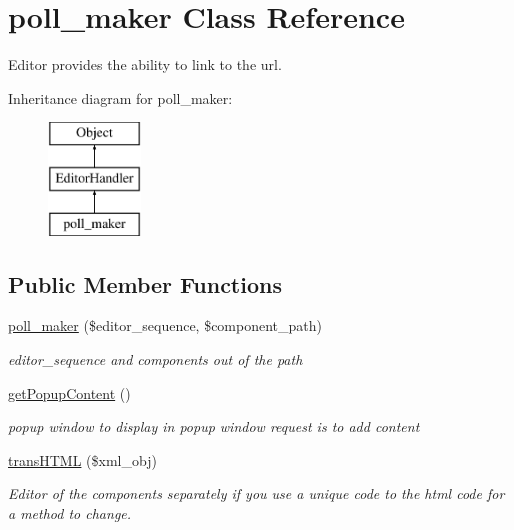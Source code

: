 \hypertarget{classpoll__maker}{\section{poll\-\_\-maker Class Reference}
\label{classpoll__maker}
}


Editor provides the ability to link to the url.  


Inheritance diagram for poll\-\_\-maker\-:\begin{figure}[H]
\begin{center}
\leavevmode
\includegraphics[height=3.000000cm]{classpoll__maker}
\end{center}
\end{figure}
\subsection*{Public Member Functions}
\begin{DoxyCompactItemize}
\item 
\hyperlink{classpoll__maker_ae8956a214b15ddd49a3e7538a15791ba}{poll\-\_\-maker} (\$editor\-\_\-sequence, \$component\-\_\-path)
\begin{DoxyCompactList}\small\item\em editor\-\_\-sequence and components out of the path \end{DoxyCompactList}\item 
\hyperlink{classpoll__maker_aa332538c710974acc59a6209bb1f5503}{get\-Popup\-Content} ()
\begin{DoxyCompactList}\small\item\em popup window to display in popup window request is to add content \end{DoxyCompactList}\item 
\hyperlink{classpoll__maker_ac8d4b0f45f16016ad7f711123cc98ea8}{trans\-H\-T\-M\-L} (\$xml\-\_\-obj)
\begin{DoxyCompactList}\small\item\em Editor of the components separately if you use a unique code to the html code for a method to change. \end{DoxyCompactList}\end{DoxyCompactItemize}
